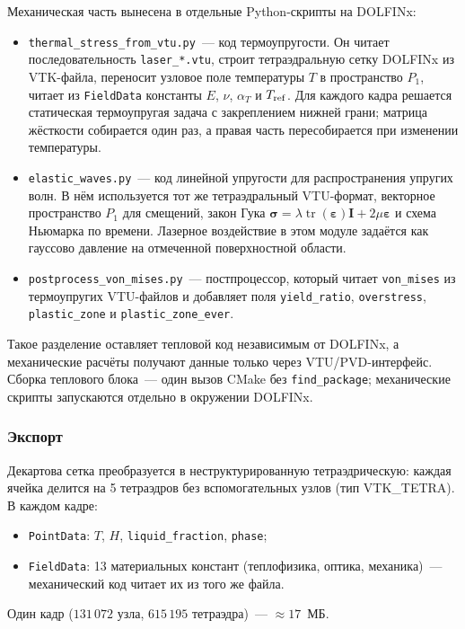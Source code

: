 Механическая часть вынесена в отдельные Python-скрипты на DOLFINx:
\begin{itemize}
  \item \texttt{thermal\_stress\_from\_vtu.py}~--- код термоупругости.
        Он читает последовательность \texttt{laser\_*.vtu}, строит
        тетраэдральную сетку DOLFINx из VTK-файла, переносит узловое
        поле температуры $T$ в пространство $P_1$, читает из
        \texttt{FieldData} константы $E$, $\nu$, $\alpha_T$ и
        $T_{\rm ref}$. Для каждого кадра решается статическая
        термоупругая задача с закреплением нижней грани; матрица
        жёсткости собирается один раз, а правая часть пересобирается
        при изменении температуры.
  \item \texttt{elastic\_waves.py}~--- код линейной упругости для
        распространения упругих волн. В нём используется тот же
        тетраэдральный VTU-формат, векторное пространство $P_1$ для
        смещений, закон Гука
        $\boldsymbol{\sigma}=\lambda\operatorname{tr}
        (\boldsymbol{\varepsilon})\mathbf{I}
        +2\mu\boldsymbol{\varepsilon}$ и схема Ньюмарка по времени.
        Лазерное воздействие в этом модуле задаётся как гауссово
        давление на отмеченной поверхностной области.
  \item \texttt{postprocess\_von\_mises.py}~--- постпроцессор, который
        читает \texttt{von\_mises} из термоупругих VTU-файлов и
        добавляет поля \texttt{yield\_ratio}, \texttt{overstress},
        \texttt{plastic\_zone} и \texttt{plastic\_zone\_ever}.
\end{itemize}

Такое разделение оставляет тепловой код независимым от DOLFINx, а
механические расчёты получают данные только через VTU/PVD-интерфейс.
Сборка теплового блока~--- один вызов CMake без \texttt{find\_package};
механические скрипты запускаются отдельно в окружении DOLFINx.

\subsubsection{Экспорт}

Декартова сетка преобразуется в неструктурированную тетраэдрическую:
каждая ячейка делится на 5 тетраэдров без вспомогательных узлов
(тип VTK\_TETRA). В каждом кадре:
\begin{itemize}
  \item \texttt{PointData}: $T$, $H$, \texttt{liquid\_fraction},
        \texttt{phase};
  \item \texttt{FieldData}: 13 материальных констант (теплофизика,
        оптика, механика)~--- механический код читает их из того же файла.
\end{itemize}
Один кадр ($131\,072$ узла, $615\,195$ тетраэдра)~--- $\approx 17$~МБ.

